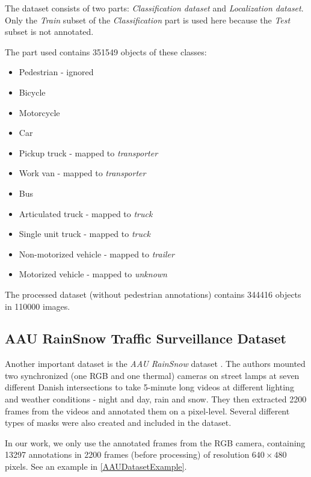 The dataset consists of two parts: \textit{Classification dataset} and
\textit{Localization dataset}. Only the \textit{Train} subset of the
\textit{Classification} part is used here because the \textit{Test} subset is
not annotated.

The part used contains \num{351549} objects of these classes:
\begin{itemize}
    \item Pedestrian - ignored
    \item Bicycle
    \item Motorcycle
    \item Car
    \item Pickup truck - mapped to \textit{transporter}
    \item Work van - mapped to \textit{transporter}
    \item Bus
    \item Articulated truck - mapped to \textit{truck}
    \item Single unit truck - mapped to \textit{truck}
    \item Non-motorized vehicle - mapped to \textit{trailer}
    \item Motorized vehicle - mapped to \textit{unknown}
\end{itemize}
The processed dataset (without pedestrian annotations) contains \num{344416}
objects in \num{110000} images.



\subsection{AAU RainSnow Traffic Surveillance Dataset}
\label{AAUDataset}

Another important dataset is the \textit{AAU RainSnow} dataset
\cite{Bahnsen2019}. The authors mounted two synchronized (one RGB and one
thermal) cameras on street lamps at seven different Danish intersections to take
5-minute long videos at different lighting and weather conditions - night and
day, rain and snow. They then extracted \num{2200} frames from the videos and
annotated them on a pixel-level. Several different types of masks were also
created and included in the dataset.

In our work, we only use the annotated frames from the RGB camera, containing
\num{13297} annotations in \num{2200} frames (before processing) of resolution
$640 \times 480$ pixels. See an example in \autoref{AAUDatasetExample}.

